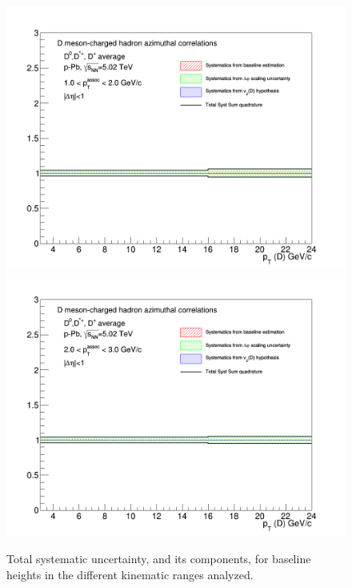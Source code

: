 \begin{figure}[!htbp]
{\includegraphics[width=0.49\linewidth, height=0.33\linewidth]{figures/FitOutput/TotalSystematicSourcesPedestal_pthad1dotto2dot.png}}
{\includegraphics[width=0.49\linewidth, height=0.33\linewidth]{figures/FitOutput/TotalSystematicSourcesPedestal_pthad2dotto3dot.png}}
\caption{Total systematic uncertainty, and its components, for baseline heights in the different kinematic ranges analyzed.}
\label{fig:baselineTotalUnc}
\end{figure}

